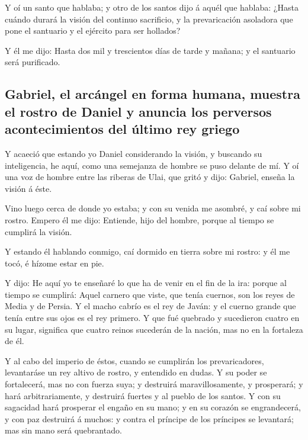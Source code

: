  Y oí un santo que hablaba; y otro de los santos dijo á
aquél que hablaba: ¿Hasta cuándo durará la visión del continuo
sacrificio, y la prevaricación asoladora que pone el santuario y el
ejército para ser hollados?

 Y él me dijo: Hasta dos mil y trescientos días de tarde
y mañana; y el santuario será purificado.

\hypertarget{gabriel-el-arcuxe1ngel-en-forma-humana-muestra-el-rostro-de-daniel-y-anuncia-los-perversos-acontecimientos-del-uxfaltimo-rey-griego}{%
\subsection{Gabriel, el arcángel en forma humana, muestra el rostro de
Daniel y anuncia los perversos acontecimientos del último rey
griego}\label{gabriel-el-arcuxe1ngel-en-forma-humana-muestra-el-rostro-de-daniel-y-anuncia-los-perversos-acontecimientos-del-uxfaltimo-rey-griego}}

 Y acaeció que estando yo Daniel considerando la visión,
y buscando su inteligencia, he aquí, como una semejanza de hombre se
puso delante de mí.  Y oí una voz de hombre entre las
riberas de Ulai, que gritó y dijo: Gabriel, enseña la visión á éste.

 Vino luego cerca de donde yo estaba; y con su venida me
asombré, y caí sobre mi rostro. Empero él me dijo: Entiende, hijo del
hombre, porque al tiempo se cumplirá la visión.

 Y estando él hablando conmigo, caí dormido en tierra
sobre mi rostro: y él me tocó, é hízome estar en pie.

 Y dijo: He aquí yo te enseñaré lo que ha de venir en el
fin de la ira: porque al tiempo se cumplirá:  Aquel
carnero que viste, que tenía cuernos, son los reyes de Media y de
Persia.  Y el macho cabrío es el rey de Javán: y el
cuerno grande que tenía entre sus ojos es el rey primero.
 Y que fué quebrado y sucedieron cuatro en su lugar,
significa que cuatro reinos sucederán de la nación, mas no en la
fortaleza de él.

 Y al cabo del imperio de éstos, cuando se cumplirán los
prevaricadores, levantaráse un rey altivo de rostro, y entendido en
dudas.  Y su poder se fortalecerá, mas no con fuerza
suya; y destruirá maravillosamente, y prosperará; y hará
arbitrariamente, y destruirá fuertes y al pueblo de los santos.
 Y con su sagacidad hará prosperar el engaño en su mano;
y en su corazón se engrandecerá, y con paz destruirá á muchos: y contra
el príncipe de los príncipes se levantará; mas sin mano será
quebrantado.

